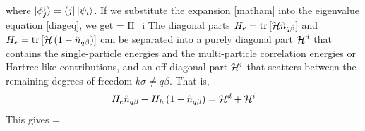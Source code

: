 \documentclass[12pt,twoside]{report}
\numberwithin{equation}{section}
\begin{document}
where \(\ket{\phi_j^i} = \bra{j}\ket{\psi_i}\). If we substitute the expansion \ref{matham} into the eigenvalue equation \ref{diageq}, we get
\beq
{} = \tilde H_i
\eeq
The diagonal parts \(H_e = \text{tr}\left[{\mathcal{H} \hat n_{q\beta}}\right]\) and \(H_e = \text{tr}\left[{\mathcal{H} \left({1 - \hat n_{q\beta}}\right)}\right]\) can be separated into a purely diagonal part \(\mathcal{H}^d\) that contains the single-particle energies and the multi-particle correlation energies or Hartree-like contributions, and an off-diagonal part  \(\mathcal{H}^i\) that scatters between the remaining degrees of freedom \(k\sigma \neq q\beta\). That is,
\begin{equation*}
\begin{gathered}
H_e \hat n_{q\beta} + H_h \left({1 - \hat n_{q\beta}}\right) = \mathcal{H}^d + \mathcal{H}^i\\
\end{gathered}
\end{equation*}
This gives
\beq
{} = 
\eeq
\end{document}
